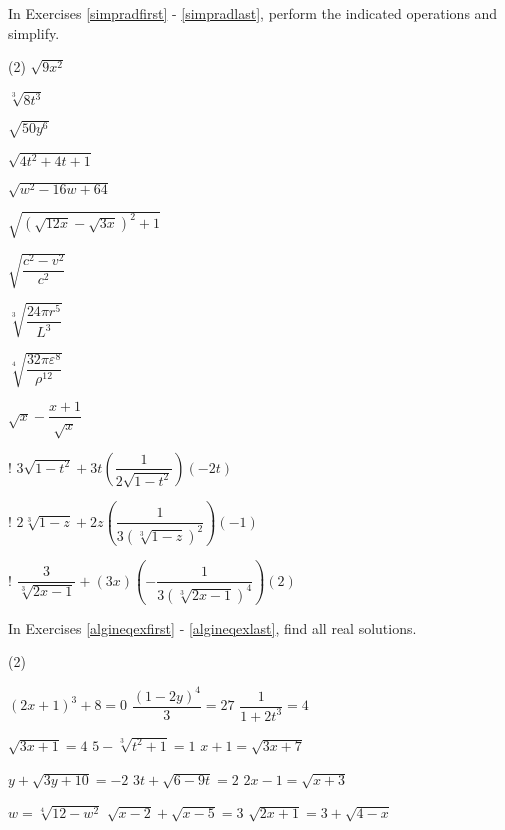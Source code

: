 \label{ExercisesforAppRadEqus}

In Exercises \ref{simpradfirst} - \ref{simpradlast}, perform the indicated operations and simplify.

\begin{tasks}(2)
\task   $\sqrt{9x^2}$ \label{simpradfirst}

\task   $\sqrt[3]{8t^3}$

\task   $\sqrt{50y^6}$

\task  $\sqrt{4t^2 + 4t + 1}$

\task  $\sqrt{w^2 - 16w + 64}$

\task  $\sqrt{(\sqrt{12x} - \sqrt{3x})^2+1}$

\task  $\sqrt{\dfrac{c^2 - v^2}{c^2}}$

\task  $\sqrt[3]{\dfrac{24 \pi r^5}{L^3}}$

\task   $\sqrt[4]{\dfrac{32 \pi \varepsilon^8}{\rho^{12}}}$    

\task $\sqrt{x} - \dfrac{x+1}{\sqrt{x}}$

\task! $3 \sqrt{1-t^2} + 3t\left(\dfrac{1}{2 \sqrt{1-t^2}}\right)(-2t)$

\task! $2 \sqrt[3]{1-z} + 2z \left(\dfrac{1}{3 \left(\sqrt[3]{1-z}\right)^2}\right)(-1)$


\task!  $\dfrac{3}{\sqrt[3]{2x-1}} + (3x)\left(-\dfrac{1}{3 \left(\sqrt[3]{2x-1} \right)^4}\right)(2)$  \label{simpradlast}

\end{tasks}



In Exercises \ref{algineqexfirst} - \ref{algineqexlast}, find all real solutions.

\begin{tasks}[resume](2)

\task  $(2x+1)^3 + 8 = 0$ \label{algineqexfirst} 
\task $\dfrac{(1-2y)^{4}}{3} = 27$ 
\task  $\dfrac{1}{1 + 2t^3} = 4$ 

\task $\sqrt{3x+1} = 4$
\task $5 - \sqrt[3]{t^2+1} = 1$
\task $x+1 = \sqrt{3x+7}$ %

\task  $y + \sqrt{3y+10} = -2$ %
\task  $3t+\sqrt{6-9t}=2$ %
\task $2x - 1 = \sqrt{x + 3}$ %


\task $w = \sqrt[4]{12-w^2}$
\task $\sqrt{x - 2} + \sqrt{x - 5} = 3$ %
\task $\sqrt{2x+1} = 3 + \sqrt{4-x}$  \label{algineqexlast} %

\end{tasks}

